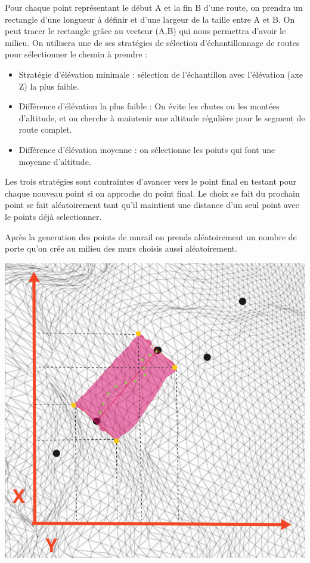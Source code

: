 Pour chaque point représentant le début A et la fin B d’une route, on prendra un rectangle d’une longueur à définir et d’une largeur de la taille entre A et B. On peut tracer le rectangle grâce au vecteur (A,B) qui nous permettra d’avoir le milieu.
On utilisera une de ses stratégies de sélection d'échantillonnage de routes pour sélectionner le chemin à prendre :\\

\begin{itemize}
  \item Stratégie d'élévation minimale : sélection de l'échantillon avec l'élévation (axe Z) la plus faible.
  \item Différence d'élévation la plus faible : On évite les chutes ou les montées d'altitude, et on cherche à maintenir une altitude régulière pour le segment de route complet. 
  \item Différence d'élévation moyenne : on sélectionne les points qui font une moyenne d’altitude.
\end{itemize}

Les trois stratégies sont contraintes d’avancer vers le point final en testant pour chaque nouveau point si on approche du point final.
Le choix se fait du prochain point se fait aléatoirement tant qu’il maintient une distance d’un seul point avec le points déjà selectionner.

Après la generation des points de murail on prends aléatoirement un nombre de porte qu’on crée au milieu des murs choisis aussi aléatoirement.

\begin{center}
  \includegraphics[height = 8 cm]{images/algo.png}\\
\end{center}

